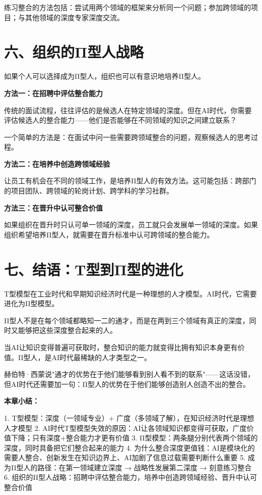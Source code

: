 练习整合的方法包括：尝试用两个领域的框架来分析同一个问题；参加跨领域的项目；与其他领域的深度专家深度交流。

\section{六、组织的Π型人战略}


如果个人可以选择成为Π型人，组织也可以有意识地培养Π型人。

\textbf{方法一：在招聘中评估整合能力}

传统的面试流程，往往评估的是候选人在特定领域的深度。但在AI时代，你需要评估候选人的整合能力——他们是否能够在不同领域的知识之间建立联系？

一个简单的方法是：在面试中问一些需要跨领域整合的问题，观察候选人的思考过程。

\textbf{方法二：在培养中创造跨领域经验}

让员工有机会在不同的领域工作，是培养Π型人的有效方法。这可能包括：跨部门的项目团队、跨领域的轮岗计划、跨学科的学习社群。

\textbf{方法三：在晋升中认可整合价值}

如果组织在晋升时只认可单一领域的深度，员工就只会发展单一领域的深度。如果组织希望培养Π型人，就需要在晋升标准中认可跨领域的整合能力。

\section{七、结语：T型到Π型的进化}


T型模型在工业时代和早期知识经济时代是一种理想的人才模型。AI时代，它需要进化为Π型模型。

Π型人不是在每个领域都略知一二的通才，而是在两到三个领域有真正的深度，同时又能够把这些深度整合起来的人。

当AI让知识变得普遍可获取时，整合知识的能力就变得比拥有知识本身更有价值。Π型人，是AI时代最稀缺的人才类型之一。

赫伯特·西蒙说"通才的优势在于他们能够看到别人看不到的联系"——这话没错，但AI时代还需要加一句：Π型人的优势在于他们能够创造别人创造不出的整合。


\textbf{本章小结：}

1. T型模型：深度（一领域专业）+ 广度（多领域了解），在知识经济时代是理想人才模型
2. AI时代T型模型失效的原因：AI让各领域知识都变得可获取，广度价值下降；只有深度+整合能力才更有价值
3. Π型模型：两条腿分别代表两个领域的深度，同时具备把它们整合起来的能力
4. 为什么整合深度更值钱：AI是模块化的需要人整合、创新发生在知识边界上、AI加剧了信息过载需要判断什么重要
5. 成为Π型人的路径：在第一领域建立深度 → 战略性发展第二深度 → 刻意练习整合
6. 组织的Π型人战略：招聘中评估整合能力，培养中创造跨领域经验、晋升中认可整合价值
